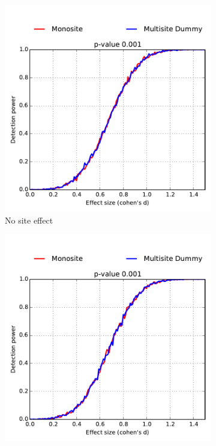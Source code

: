 \documentclass[authoryear]{elsarticle}
\begin{document}
\begin{figure}
        \centering
        \begin{subfigure}[b]{0.475\textwidth}
            \centering
            \includegraphics[width=\textwidth]{../figures/detect_pow_bal5050_var0_site0.pdf}
            {{\tiny No site effect}}    
            \label{fig:mean and std of net14}
        \end{subfigure}
        \hfill
        \begin{subfigure}[b]{0.475\textwidth}  
            \centering 
            \includegraphics[width=\textwidth]{../figures/detect_pow_bal5050_var0_site05.pdf}

\end{subfigure}
\end{figure}
\end{document}
